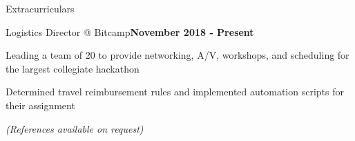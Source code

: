 \documentclass[mm,centered]{resume} %
\begin{document}

\begin{rSection}{Extracurriculars} 

	\begin{rSubsection}{Logistics Director @ Bitcamp}{\textbf{November 2018 - Present}}{}{}
		\item Leading a team of 20 to provide networking, A/V, workshops, and scheduling for the largest collegiate hackathon
		\item Determined travel reimbursement rules and implemented automation scripts for their assignment
	\end{rSubsection}

\end{rSection}

\begin{center}
	\vspace{4mm}
	\textit{(References available on request)}
\end{center}
\end{document}
